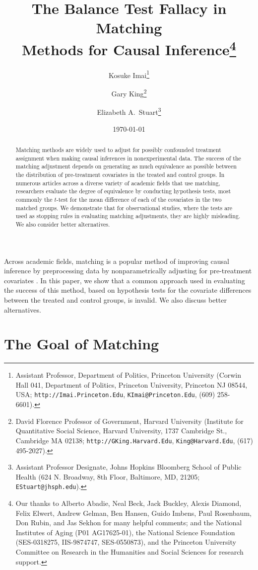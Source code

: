 \documentclass[11pt,titlepage]{article}
\title{The Balance Test Fallacy in Matching\\ Methods for Causal
  Inference\thanks{Our thanks to Alberto Abadie, Neal Beck, Jack
    Buckley, Alexis Diamond, Felix Elwert, Andrew Gelman, Ben Hansen,
    Guido Imbens, Paul Rosenbaum, Don Rubin, and Jas Sekhon for many
    helpful comments; and the National Institutes of Aging (P01
    AG17625-01), the National Science Foundation (SES-0318275,
    IIS-9874747, SES-0550873), and the Princeton University Committee
    on Research in the Humanities and Social Sciences for research
    support.}}
\author{Kosuke Imai\thanks{Assistant Professor, Department of
    Politics, Princeton University (Corwin Hall 041, Department of
    Politics, Princeton University, Princeton NJ 08544, USA;
    \texttt{http://Imai.Princeton.Edu}, \texttt{KImai@Princeton.Edu},
    (609) 258-6601).}  \and Gary King\thanks{David Florence Professor
    of Government, Harvard University (Institute for Quantitative
    Social Science, Harvard University, 1737 Cambridge St., Cambridge
    MA 02138; \texttt{http://GKing.Harvard.Edu},
    \texttt{King@Harvard.Edu}, (617) 495-2027).}  \and Elizabeth A.\ 
  Stuart\thanks{Assistant Professor Designate, Johns Hopkins Bloomberg
    School of Public Health (624 N. Broadway, 8th Floor, Baltimore,
    MD, 21205; \texttt{EStuart@jhsph.edu}).}}
\date{\today}
\begin{document}
\maketitle

\begin{abstract}
  Matching methods are widely used to adjust for possibly confounded
  treatment assignment when making causal inferences in
  nonexperimental data.  The success of the matching adjustment
  depends on generating as much equivalence as possible between the
  distribution of pre-treatment covariates in the treated and control
  groups.  In numerous articles across a diverse variety of academic
  fields that use matching, researchers evaluate the degree of
  equivalence by conducting hypothesis tests, most commonly the
  $t$-test for the mean difference of each of the covariates in the
  two matched groups.  We demonstrate that for observational studies,
  where the tests are used as stopping rules in evaluating matching
  adjustments, they are highly misleading.  We also consider better
  alternatives.
\end{abstract}

Across academic fields, matching is a popular method of improving
causal inference by preprocessing data by nonparametrically adjusting
for pre-treatment covariates \citep{Imbens04,Rosenbaum02,Rubin06}.  In
this paper, we show that a common approach used in evaluating the
success of this method, based on hypothesis tests for the covariate
differences between the treated and control groups, is invalid.  We
also discuss better alternatives.

\section{The Goal of Matching}
\end{document}

